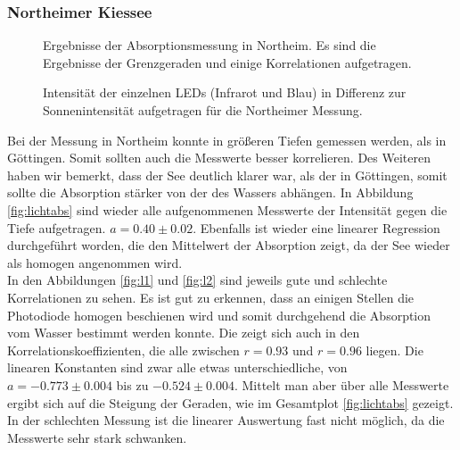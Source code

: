 \documentclass[12pt,a4paper,titlepage,headinclude,bibtotoc]{scrartcl}
\numberwithin{equation}{subsection}
\begin{document}
\subsubsection{Northeimer Kiessee}
\begin{figure}[!h]
	\centering
   \hfill
   \hfill
   \hfill
	\caption{Ergebnisse der Absorptionsmessung in Northeim. Es sind die Ergebnisse der Grenzgeraden und einige Korrelationen aufgetragen.}
	\label{fig:lichtNort}
\end{figure}
\begin{figure}[!htb]
	\centering
	\resizebox{0.7\linewidth}{!}{}
	\caption{Intensität der einzelnen LEDs (Infrarot und Blau) in Differenz zur Sonnenintensität aufgetragen für die Northeimer Messung.}
	\label{fig:led}
\end{figure}
Bei der Messung in Northeim konnte in größeren Tiefen gemessen werden, als in Göttingen.
Somit sollten auch die Messwerte besser korrelieren.
Des Weiteren haben wir bemerkt, dass der See deutlich klarer war, als der in Göttingen, somit sollte die Absorption stärker von der des Wassers abhängen.
In Abbildung \ref{fig:lichtabs} sind wieder alle aufgenommenen Messwerte der Intensität gegen die Tiefe aufgetragen.
$a=0.40\pm0.02$.
Ebenfalls ist wieder eine linearer Regression durchgeführt worden, die den Mittelwert der Absorption zeigt, da der See wieder als homogen angenommen wird.\\
In den Abbildungen \ref{fig:l1} und \ref{fig:l2} sind jeweils gute und schlechte Korrelationen zu sehen.
Es ist gut zu erkennen, dass an einigen Stellen die Photodiode homogen beschienen wird und somit durchgehend die Absorption vom Wasser bestimmt werden konnte.
Die zeigt sich auch in den Korrelationskoeffizienten, die alle zwischen $r=0.93$ und $r=0.96$ liegen.
Die linearen Konstanten sind zwar alle etwas unterschiedliche, von $a=-0.773\pm0.004$ bis zu $-0.524\pm0.004$.
Mittelt man aber über alle Messwerte ergibt sich auf die Steigung der Geraden, wie im Gesamtplot \ref{fig:lichtabs} gezeigt.
In der schlechten Messung ist die linearer Auswertung fast nicht möglich, da die Messwerte sehr stark schwanken.
\end{document}
